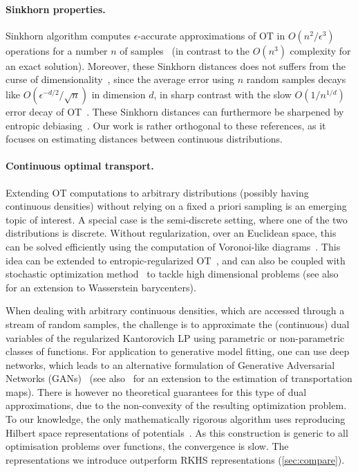 \paragraph{Sinkhorn properties.} Sinkhorn algorithm computes $\epsilon$-accurate
approximations of OT in $O(n^2/\epsilon^3)$ operations for a number $n$ of
samples~\citep{altschuler2017near} (in contrast to the $O(n^3)$ complexity for an
exact solution). Moreover, these Sinkhorn distances does not suffers from the
curse of dimensionality~\citep{2019-Genevay-aistats}, since the average error
using $n$ random samples decays like $O(\epsilon^{-d/2}/\sqrt{n})$ in dimension
$d$, in sharp contrast with the slow $O(1/n^{1/d})$ error decay of
OT~\citep{dudley_speed_1969,weed2019sharp}. These Sinkhorn distances can furthermore be sharpened
by entropic debiasing~\citep{2019-Feydy-aistats}. Our work is rather orthogonal to these references, as it focuses on estimating distances between continuous distributions.

\paragraph{Continuous optimal transport.} Extending OT computations to arbitrary
distributions (possibly having continuous densities) without relying on a fixed
a priori sampling is an emerging topic of interest. A special case is the
semi-discrete setting, where one of the two distributions is discrete. Without
regularization, over an Euclidean space, this can be solved efficiently using
the computation of Voronoi-like diagrams~\citep{merigot2011multiscale}. This
idea can be extended to entropic-regularized OT~\citep{cuturi2018semidual}, and
can also be coupled with stochastic optimization
method~\citep{2016-genevay-nips} to tackle high dimensional problems (see
also~\citet{staib2017parallel} for an extension to Wasserstein barycenters). 

When dealing with arbitrary continuous densities, which are accessed through a
stream of random samples, the challenge is to approximate  the (continuous) dual
variables of the regularized Kantorovich LP using parametric or non-parametric
classes of functions. For application to generative model fitting, one can use
deep networks, which leads to an alternative formulation of Generative
Adversarial Networks (GANs)~\citep{arjovsky2017wgan} (see
also~\citet{seguy2018large} for an extension to the estimation of transportation
maps). There is however no theoretical guarantees for this type of dual
approximations, due to the non-convexity of the resulting optimization problem.
To our knowledge, the only mathematically rigorous algorithm uses reproducing
Hilbert space representations of potentials~\citep{2016-genevay-nips}. As this
construction is generic to all optimisation problems over functions, the convergence is slow. The representations we introduce outperform RKHS representations (\autoref{sec:compare}).